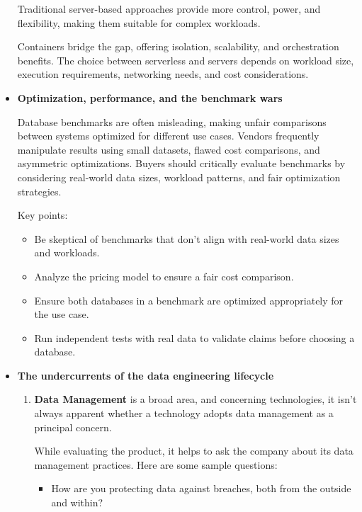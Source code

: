 \begin{itemize}
    Traditional server-based approaches provide more control, power,
    and flexibility, making them suitable for complex workloads.
    
    Containers bridge the gap, offering isolation, scalability, and
    orchestration benefits. The choice between serverless and servers
    depends on workload size, execution requirements, networking needs,
    and cost considerations.


    \item \textbf{Optimization, performance, and the benchmark wars}
    
    \noindent
    Database benchmarks are often misleading, making unfair comparisons
    between systems optimized for different use cases. Vendors frequently
    manipulate results using small datasets, flawed cost comparisons,
    and asymmetric optimizations. Buyers should critically evaluate
    benchmarks by considering real-world data sizes, workload patterns,
    and fair optimization strategies.

    Key points:
    \begin{itemize}
        \item Be skeptical of benchmarks that don't align with real-world
        data sizes and workloads.

        \item Analyze the pricing model to ensure a fair cost comparison.
        
        \item Ensure both databases in a benchmark are optimized
        appropriately for the use case.

        \item Run independent tests with real data to validate claims
        before choosing a database.
    \end{itemize}


    \item \textbf{The undercurrents of the data engineering lifecycle}
    
    \begin{enumerate}
        \item \textbf{Data Management} is a broad area, and concerning
        technologies, it isn't always apparent whether a technology
        adopts data management as a principal concern.
        
        While evaluating the product, it helps to ask the company
        about its data management practices. Here are  some sample
        questions:
        \begin{itemize}
            \item How are you protecting data against breaches,
            both from the outside and within?


\end{itemize}
\end{enumerate}
\end{itemize}
